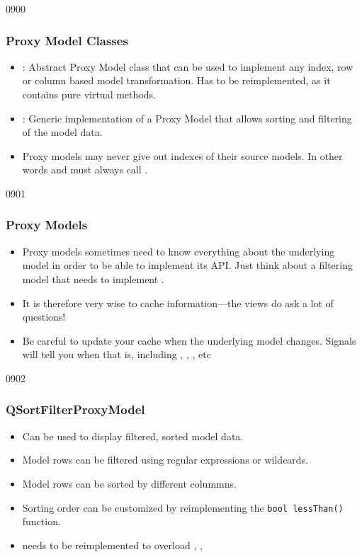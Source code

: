 \begin{slide}[fragile]{0900}\frametitle{Proxy Model Classes}
  \begin{itemize}
  \item {}: Abstract Proxy Model class that can be used to
    implement any index, row or column based model transformation. Has to be
    reimplemented, as it contains pure virtual methods.
  \item {}: Generic implementation of a Proxy Model that
    allows sorting and filtering of the model data. 
  \item Proxy models may never give out indexes of their source models. In
    other words  and  must always call .
  \end{itemize}
\end{slide}

\begin{slide}{0901}\frametitle{Proxy Models}
\begin{itemize}
\item Proxy models sometimes need to know everything about the underlying
  model in order to be able to implement its API. Just think about a filtering model
  that needs to implement .
\item It is therefore very wise to cache information---the views do ask a
  lot of questions!
\item Be careful to update your cache when the underlying model
  changes. Signals will tell you when that is, including
  ,
  ,
  , etc
\end{itemize}
\end{slide}


\begin{slide}[fragile]{0902}\frametitle{QSortFilterProxyModel}
  \begin{itemize}
  \item Can be used to display filtered, sorted model data.
  \item Model rows can be filtered using regular expressions or wildcards. 
  \item Model rows can be sorted by different colummns. 
  \item Sorting order can be customized by reimplementing the \texttt{bool lessThan()}
    function. 
  \item needs to be reimplemented to overload ,
    , 
  \end{itemize}
\end{slide}


